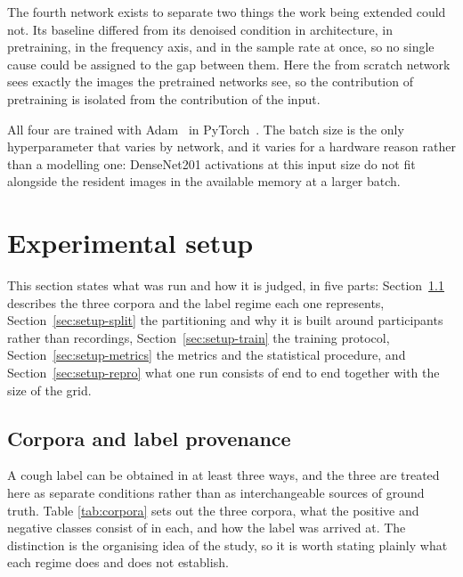 \documentclass{ieeeaccess}
\begin{document}
The fourth network exists to separate two things the work being extended could not. Its
baseline differed from its denoised condition in architecture, in pretraining, in the
frequency axis, and in the sample rate at once, so no single cause could be assigned to
the gap between them. Here the from scratch network sees exactly the images the
pretrained networks see, so the contribution of pretraining is isolated from the
contribution of the input.

All four are trained with Adam~\cite{kingma2015} in PyTorch~\cite{paszke2019}. The batch
size is the only hyperparameter that varies by network, and it varies for a hardware
reason rather than a modelling one: DenseNet201 activations at this input size do not fit
alongside the resident images in the available memory at a larger batch.

\section{Experimental setup}\label{sec:setup}

This section states what was run and how it is judged, in five parts:
Section~\ref{sec:setup-corpora} describes the three corpora and the label regime each
one represents, Section~\ref{sec:setup-split} the partitioning and why it is built around
participants rather than recordings, Section~\ref{sec:setup-train} the training protocol,
Section~\ref{sec:setup-metrics} the metrics and the statistical procedure, and
Section~\ref{sec:setup-repro} what one run consists of end to end together with the size
of the grid.

\subsection{Corpora and label provenance}\label{sec:setup-corpora}

A cough label can be obtained in at least three ways, and the three are treated here as
separate conditions rather than as interchangeable sources of ground truth. Table
\ref{tab:corpora} sets out the three corpora, what the positive and negative classes
consist of in each, and how the label was arrived at. The distinction is the organising
idea of the study, so it is worth stating plainly what each regime does and does not
establish.
\end{document}
